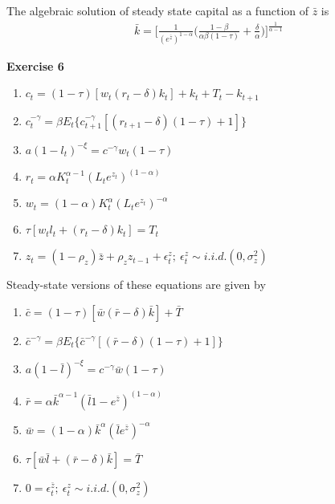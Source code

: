 \documentclass[letterpaper,12pt]{article}
\begin{document}
The algebraic solution of steady state capital as a function of $\bar{z}$ is
\begin{align*}
\bar{k} = 
\Big[ \frac{1}{(e^{\bar{z}})^{1-\alpha}} \Big( \frac{1-\beta}{\alpha\beta(1-\tau)} + \frac{\delta}{\alpha} \Big) \Big] ^{\frac{1}{\alpha - 1}}
\end{align*}

\textbf{Exercise 6}

\begin{enumerate}
	\item $c_t = (1 - \tau)[w_t (r_t - \delta) k_t] + k_t + T_t - k_{t+1}$
	\item $c_t^{-\gamma} = \beta E_t \{c_{t+1}^{-\gamma} [(r_{t+1} - \delta)(1 - \tau) + 1]\}$
	\item $a(1-l_t)^{-\xi} = c^{-\gamma} w_t (1 - \tau)$
	\item $r_t = \alpha K_t^{\alpha-1} (L_t e^{z_t})^{(1 - \alpha)}$
	\item $w_t = (1 - \alpha) K_t^\alpha (L_t e^{z_t}) ^{-\alpha}$
	\item $\tau[w_t l_t + (r_t - \delta) k_t] = T_t$
	\item $z_t = (1 - \rho_z) \bar{z} + \rho_z z_{t-1} + \epsilon_t^z; \ \epsilon_t^z \sim i.i.d.(0, \sigma_z^2)$
\end{enumerate}

Steady-state versions of these equations are given by
\begin{enumerate}
	\item $\bar{c} = (1 - \tau)[\bar{w} (\bar{r} - \delta) \bar{k}]  + \bar{T} $
	\item $\bar{c}^{-\gamma} = \beta E_t \{\bar{c}^{-\gamma} [(\bar{r} - \delta)(1 - \tau) + 1]\}$
	\item $a(1-\bar{l})^{-\xi} = c^{-\gamma} \bar{w} (1 - \tau)$
	\item $\bar{r} = \alpha \bar{k}^{\alpha-1} (\bar{l} 1 - e^{\bar{z}})^{(1 - \alpha)}$
	\item $\bar{w} = (1 - \alpha) \bar{k}^\alpha (\bar{l} e^{\bar{z}}) ^{-\alpha}$
	\item $\tau[\bar{w} \bar{l} + (\bar{r} - \delta) \bar{k}] = \bar{T}$
	\item $0 = \epsilon_t^{\bar{z}}; \ \epsilon_t^z \sim i.i.d.(0, \sigma_z^2)$
\end{enumerate}
\end{document}
